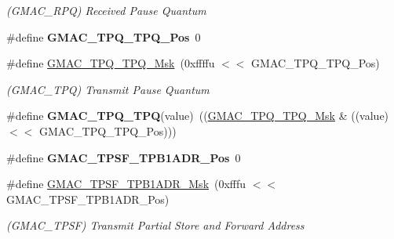 \begin{DoxyCompactItemize}
\begin{DoxyCompactList}\small\item\em (G\+M\+A\+C\+\_\+\+R\+PQ) Received Pause Quantum \end{DoxyCompactList}\item 
\mbox{\label{group__SAME70__GMAC_ga499a777bde45cefb80e701d01c94270f}} 
\#define {\bfseries G\+M\+A\+C\+\_\+\+T\+P\+Q\+\_\+\+T\+P\+Q\+\_\+\+Pos}~0
\item 
\mbox{\label{group__SAME70__GMAC_ga96640d37990bbf63b4de1ce164c75577}} 
\#define \mbox{\hyperlink{group__SAME70__GMAC_ga96640d37990bbf63b4de1ce164c75577}{G\+M\+A\+C\+\_\+\+T\+P\+Q\+\_\+\+T\+P\+Q\+\_\+\+Msk}}~(0xffffu $<$$<$ G\+M\+A\+C\+\_\+\+T\+P\+Q\+\_\+\+T\+P\+Q\+\_\+\+Pos)
\begin{DoxyCompactList}\small\item\em (G\+M\+A\+C\+\_\+\+T\+PQ) Transmit Pause Quantum \end{DoxyCompactList}\item 
\mbox{\label{group__SAME70__GMAC_gaf802993e6cc516824a1d79878a52695b}} 
\#define {\bfseries G\+M\+A\+C\+\_\+\+T\+P\+Q\+\_\+\+T\+PQ}(value)~((\mbox{\hyperlink{group__SAMV71__GMAC_ga96640d37990bbf63b4de1ce164c75577}{G\+M\+A\+C\+\_\+\+T\+P\+Q\+\_\+\+T\+P\+Q\+\_\+\+Msk}} \& ((value) $<$$<$ G\+M\+A\+C\+\_\+\+T\+P\+Q\+\_\+\+T\+P\+Q\+\_\+\+Pos)))
\item 
\mbox{\label{group__SAME70__GMAC_ga5a938aff37867468717270bf57e841c1}} 
\#define {\bfseries G\+M\+A\+C\+\_\+\+T\+P\+S\+F\+\_\+\+T\+P\+B1\+A\+D\+R\+\_\+\+Pos}~0
\item 
\mbox{\label{group__SAME70__GMAC_ga4af004798e3b626f8ce57da437c8dd72}} 
\#define \mbox{\hyperlink{group__SAME70__GMAC_ga4af004798e3b626f8ce57da437c8dd72}{G\+M\+A\+C\+\_\+\+T\+P\+S\+F\+\_\+\+T\+P\+B1\+A\+D\+R\+\_\+\+Msk}}~(0xfffu $<$$<$ G\+M\+A\+C\+\_\+\+T\+P\+S\+F\+\_\+\+T\+P\+B1\+A\+D\+R\+\_\+\+Pos)
\begin{DoxyCompactList}\small\item\em (G\+M\+A\+C\+\_\+\+T\+P\+SF) Transmit Partial Store and Forward Address \end{DoxyCompactList}\item 
\mbox{\label{group__SAME70__GMAC_ga0ea54c6aa0c95f36f4527108721426c4}} 
$$
\end{DoxyCompactItemize}
